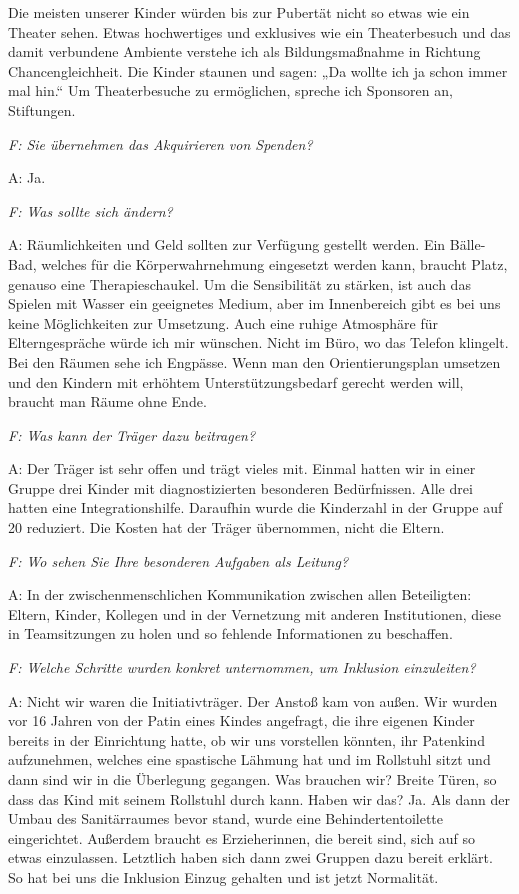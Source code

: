 Die meisten unserer Kinder würden bis zur Pubertät nicht so etwas wie ein Theater sehen. Etwas hochwertiges und exklusives wie ein Theaterbesuch und das damit verbundene Ambiente verstehe ich als Bildungsmaßnahme in Richtung Chancengleichheit. Die Kinder staunen und sagen: „Da wollte ich ja schon immer mal hin.“ Um Theaterbesuche zu ermöglichen, spreche ich Sponsoren an, Stiftungen. 

\emph{F: Sie übernehmen das Akquirieren von Spenden?}

A: Ja.

\emph{F: Was sollte sich ändern?} 

A: Räumlichkeiten und Geld sollten zur Verfügung gestellt werden. Ein Bälle-Bad, welches für die Körperwahrnehmung eingesetzt werden kann, braucht Platz, genauso eine Therapieschaukel. Um die Sensibilität zu stärken, ist auch das Spielen mit Wasser ein geeignetes Medium, aber im Innenbereich gibt es bei uns keine Möglichkeiten zur Umsetzung. 
Auch eine ruhige Atmosphäre für Elterngespräche würde ich mir wünschen. Nicht im Büro, wo das Telefon klingelt. 
Bei den Räumen sehe ich Engpässe. Wenn man den Orientierungsplan umsetzen und den Kindern mit erhöhtem Unterstützungsbedarf gerecht werden will, braucht man Räume ohne Ende. 

\emph{F: Was kann der Träger dazu beitragen?} 

A: Der Träger ist sehr offen und trägt vieles mit. Einmal hatten wir in einer Gruppe drei Kinder mit diagnostizierten besonderen Bedürfnissen. Alle drei hatten eine Integrationshilfe. Daraufhin wurde die Kinderzahl in der Gruppe auf 20 reduziert. Die Kosten hat der Träger übernommen, nicht die Eltern.

\emph{F: Wo sehen Sie Ihre besonderen Aufgaben als Leitung?} 

A: In der zwischenmenschlichen Kommunikation zwischen allen Beteiligten: Eltern, Kinder, Kollegen und in der Vernetzung mit anderen Institutionen, diese in Teamsitzungen zu holen und so fehlende Informationen zu beschaffen. 

\emph{F: Welche Schritte wurden konkret unternommen, um Inklusion einzuleiten?}

A: Nicht wir waren die Initiativträger. Der Anstoß kam von außen. Wir wurden vor 16 Jahren von der Patin eines Kindes angefragt, die ihre eigenen Kinder bereits in der Einrichtung hatte, ob wir uns vorstellen könnten, ihr Patenkind aufzunehmen, welches eine spastische Lähmung hat und im Rollstuhl sitzt und dann sind wir in die Überlegung gegangen. Was brauchen wir? Breite Türen, so dass das Kind mit seinem Rollstuhl durch kann. Haben wir das? Ja. Als dann der Umbau des Sanitärraumes bevor stand, wurde eine Behindertentoilette eingerichtet. 
Außerdem braucht es Erzieherinnen, die bereit sind, sich auf so etwas einzulassen. Letztlich haben sich dann zwei Gruppen dazu bereit erklärt. So hat bei uns die Inklusion Einzug gehalten und ist jetzt Normalität. 


